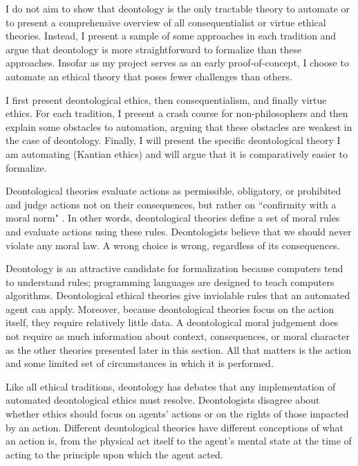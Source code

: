 \begin{isabellebody}
\begin{isamarkuptext}
I do not aim to show that deontology is the only tractable theory to automate or
to present a comprehensive overview of all consequentialist or virtue ethical theories. Instead, I 
present a sample of some approaches in each tradition and argue that deontology is more straightforward 
to formalize than these approaches. Insofar as my project serves 
as an early proof-of-concept, I choose to automate an ethical theory that 
poses fewer challenges than others.

I first present deontological ethics, then consequentialism, and finally virtue ethics. For each 
tradition, I present a crash course for non-philosophers and then explain some obstacles to automation, 
arguing that these obstacles are weakest in the case of deontology. Finally, I will present the specific 
deontological theory I am automating (Kantian ethics) and will argue that it is comparatively easier
to formalize.%
\end{isamarkuptext}\isamarkuptrue%
%
\isadelimdocument
%
\endisadelimdocument
%
\isatagdocument
%
\isamarkuptrue%
%
\endisatagdocument
{\isafolddocument}%
%
\isadelimdocument
%
\endisadelimdocument
%
\begin{isamarkuptext}%
Deontological theories evaluate actions as permissible, obligatory, or prohibited and judge actions 
not on their consequences, but rather on ``confirmity with a moral norm" \citep{sepdeont}. In other words, 
deontological theories define a set of moral rules and evaluate actions using
these rules. Deontologists believe that we should never violate any moral law. A wrong
choice is wrong, regardless of its consequences.%
\end{isamarkuptext}\isamarkuptrue%
%
\begin{isamarkuptext}%
Deontology is an attractive candidate for formalization because computers tend to 
understand rules; programming languages are designed to teach computers algorithms. Deontological
ethical theories give inviolable rules that an automated agent can apply. Moreover, because deontological 
theories focus on the action itself, they require relatively little data. A deontological moral judgement does not require
as much information about context, consequences, or moral character as the other theories presented later in this
section. All that matters is the action and some limited set of circumstances in which it is performed. 

Like all ethical traditions, deontology has debates that any implementation of automated deontological
ethics must resolve. Deontologists disagree about whether ethics should focus on agents' actions or 
on the rights of those impacted by an action. Different deontological theories have different conceptions 
of what an action is, from the physical act itself to the agent's mental state at the time of acting 
to the principle upon which the agent acted. 


\end{isamarkuptext}
\end{isabellebody}
